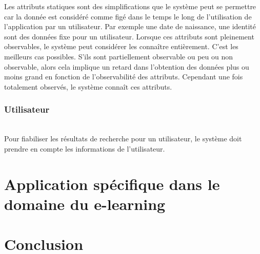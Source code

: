 \documentclass[conference]{./sty/IEEEtran}
\begin{document}
Les attributs statiques sont des simplifications que le système peut se
permettre car la donnée est considéré comme figé dans le temps le long de
l'utilisation de l'application par un utilisateur. Par exemple une date de
naissance, une identité sont des données fixe pour un utilisateur. Lorsque ces
attributs sont pleinement observables, le système peut considérer les connaître
entièrement. C'est les meilleurs cas possibles. S'ils sont partiellement
observable ou peu ou non observable, alors cela implique un retard dans
l'obtention des données plus ou moins grand en fonction de l'observabilité des
attributs. Cependant une fois totalement observés, le système connaît ces
attributs. \\

\subsubsection{Utilisateur}
~\\
Pour fiabiliser les résultats de recherche pour un utilisateur, le système doit
prendre en compte les informations de l'utilisateur. \\

\section{Application spécifique dans le domaine du e-learning}

\section{Conclusion}




\end{document}
